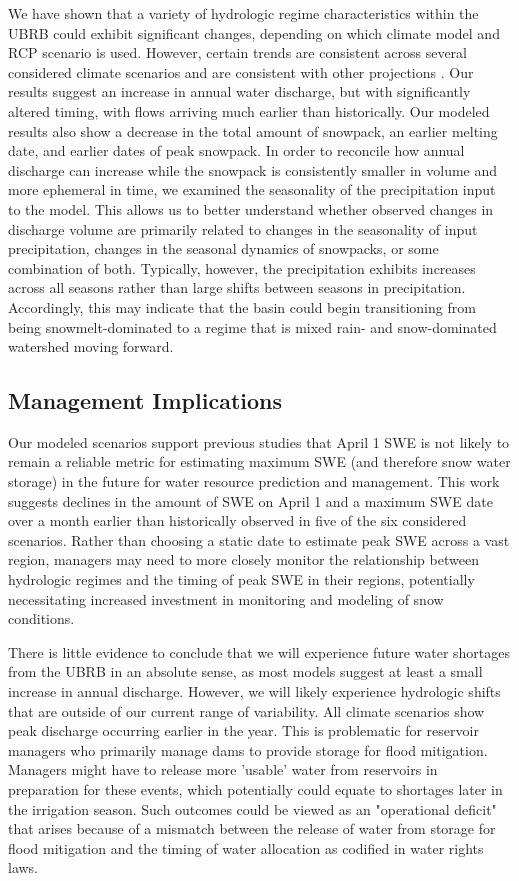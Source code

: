 \documentclass[water,article,submit,moreauthors,pdftex,10pt,a4paper]{mdpi}
\theoremstyle{mdpi}
\newcounter{ex}
\newcounter{re}
\theoremstyle{mdpidefinition}
\begin{document}
We have shown that a variety of hydrologic regime characteristics within the UBRB could exhibit significant changes, depending on which climate model and RCP scenario is used. However, certain trends are consistent across several considered climate scenarios and are consistent with other projections \citep{Adam:2009ie,Inouye:2014ws,Gergel:2017vj}. Our results suggest an increase in annual water discharge, but with significantly altered timing, with flows arriving much earlier than historically. Our modeled results also show a decrease in the total amount of snowpack, an earlier melting date, and earlier dates of peak snowpack. In order to reconcile how annual discharge can increase while the snowpack is consistently smaller in volume and more ephemeral in time, we examined the seasonality of the precipitation input to the model. This allows us to better understand whether observed changes in discharge volume are primarily related to changes in the seasonality of input precipitation, changes in the seasonal dynamics of snowpacks, or some combination of both. Typically, however, the precipitation exhibits increases across all seasons rather than large shifts between seasons in precipitation. Accordingly, this may indicate that the basin could begin transitioning from being snowmelt-dominated to a regime that is mixed rain- and snow-dominated watershed moving forward.

\subsection{Management Implications}

Our modeled scenarios support previous studies \citep{Pederson:2011ep,Klos:2014jra} that April 1 SWE is not likely to remain a reliable metric for estimating maximum SWE (and therefore snow water storage) in the future for water resource prediction and management. This work suggests declines in the amount of SWE on April 1 and a maximum SWE date over a month earlier than historically observed in five of the six considered scenarios. Rather than choosing a static date to estimate peak SWE across a vast region, managers may need to more closely monitor the relationship between hydrologic regimes and the timing of peak SWE in their regions, potentially necessitating increased investment in monitoring and modeling of snow conditions.

There is little evidence to conclude that we will experience future water shortages from the UBRB in an absolute sense, as most models suggest at least a small increase in annual discharge. However, we will likely experience hydrologic shifts that are outside of our current range of variability. All climate scenarios show peak discharge occurring earlier in the year. This is problematic for reservoir managers who primarily manage dams to provide storage for flood mitigation. Managers might have to release more 'usable' water from reservoirs in preparation for these events, which potentially could equate to shortages later in the irrigation season. Such outcomes could be viewed as an "operational deficit" that arises because of a mismatch between the release of water from storage for flood mitigation and the timing of water allocation as codified in water rights laws.
\end{document}
